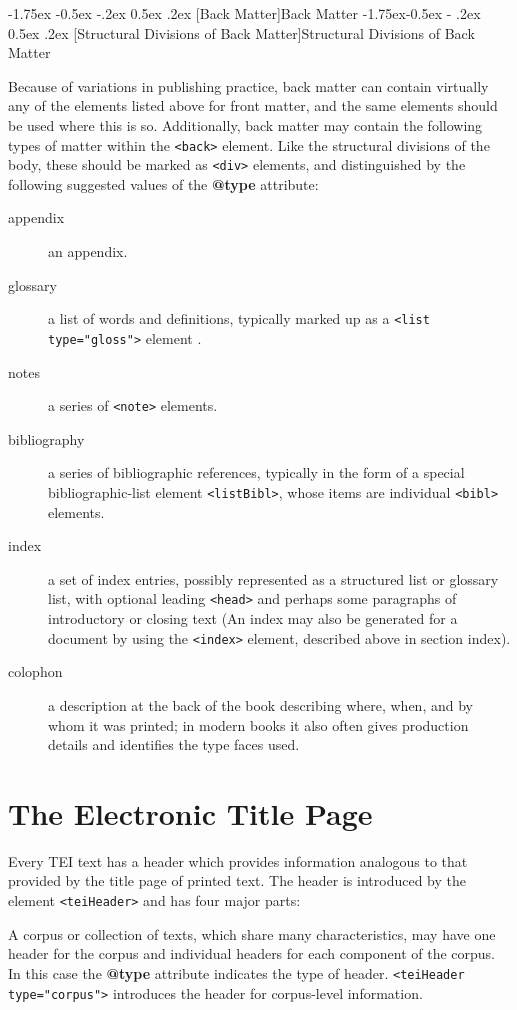 \documentclass[11pt,twoside]{article}\makeatletter
\makeatletter
\renewcommand\section{\@startsection {section}{1}{\z@}%
     {-1.75ex \@plus -0.5ex \@minus -.2ex}%
     {0.5ex \@plus .2ex}%
     {\reset@font\Large\bfseries\sffamily}}
\renewcommand\subsection{\@startsection{subsection}{2}{\z@}%
     {-1.75ex\@plus -0.5ex \@minus- .2ex}%
     {0.5ex \@plus .2ex}%
     {\reset@font\Large\sffamily}}
\renewcommand\subsubsection{\@startsection{subsubsection}{3}{\z@}%
     {-1.5ex\@plus -0.35ex \@minus -.2ex}%
     {0.5ex \@plus .2ex}%
     {\reset@font\large\sffamily}}
\def\DivI{\section}
\def\DivII{\subsection}
\def\DivIII{\subsubsection}
\def\DivI{\chapter}
\def\DivII{\section}
\def\DivIII{\subsection}
\makeatother
\begin{document}
\DivII[Back Matter]{Back Matter}
\DivIII[Structural Divisions of Back Matter]{Structural Divisions of Back Matter}\par
Because of variations in publishing practice, back matter can contain virtually any of the elements listed above for front matter, and the same elements should be used where this is so.  Additionally, back matter may contain the following types of matter within the \texttt{<back>} element.  Like the structural divisions of the body, these should be marked as  \texttt{<div>} elements, and distinguished by the following suggested values of the \textbf{@type} attribute: \begin{description}

\item[appendix]an appendix.
\item[glossary]a list of words and definitions, typically marked up as a  \texttt{<list type="gloss">} element .
\item[notes]a series of \texttt{<note>} elements.
\item[bibliography]a series of bibliographic references, typically in the form of a special bibliographic-list element \texttt{<listBibl>}, whose items are individual \texttt{<bibl>} elements.
\item[index]a set of index entries, possibly represented as a structured list or glossary list, with optional leading \texttt{<head>} and perhaps some paragraphs of introductory or closing text (An index may also be generated for a document by using the \texttt{<index>} element, described above in section  index).
\item[colophon]a description at the back of the book describing where, when, and by whom it was printed; in modern books it also often gives production details and identifies the type faces used.
\end{description} 
\DivI[The Electronic Title Page]{The Electronic Title Page}\label{U5-header}\par
Every TEI text has a header which provides information analogous to that provided by the title page of printed text. The header is introduced by the element \texttt{<teiHeader>} and has four major parts: \par
    A corpus or collection of texts, which share many characteristics, may have one header for the corpus and individual headers for each component of the corpus.  In this case the \textbf{@type} attribute indicates the type of header. \texttt{<teiHeader type="corpus">} introduces the header for corpus-level information.\par
\end{document}
